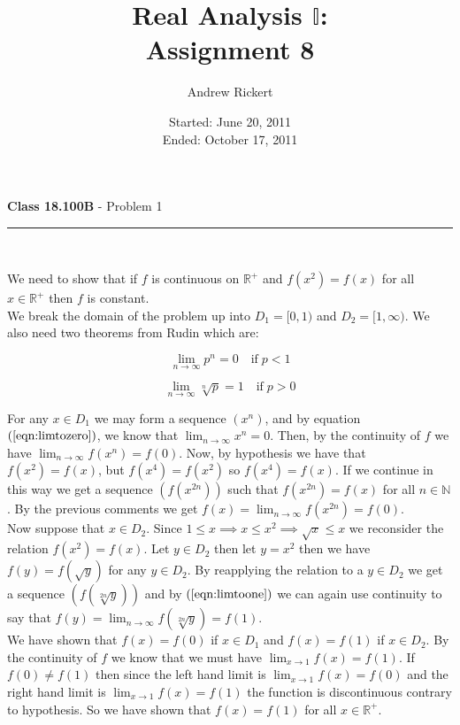 \documentclass[11pt,reqno]{article}
\title{Real Analysis $\mathbb{I}$: \\ Assignment 8}
\author{Andrew Rickert}
\date{Started: June 20, 2011 \\ \hspace{1pt} Ended: October 17,  2011}                                           %
\begin{document}
\maketitle


\begin{flushleft} 
\textbf{Class 18.100B} - Problem 1\\
\rule{500pt}{1pt}\\
\end{flushleft} 

We need to show that if $f$ is continuous on $\mathbb{R}^+$ and $f(x^2) = f(x)$ for all $x \in \mathbb{R}^+$ then $f$ is constant.\\
\indent We break the domain of the problem up into $D_1 = [0,1)$ and $D_2 = [1,\infty)$. We also need two theorems from Rudin which are:


\begin{equation}
\lim_{n \to \infty} p^n = 0 \quad \text{if} \; p < 1 \label{eqn:limtozero}
\end{equation}

\begin{equation}
\lim_{n \to \infty} \sqrt[n]{p} = 1 \quad \text{if} \; p > 0 \label{eqn:limtoone}
\end{equation}


For any $x \in D_1$ we may form a sequence $(x^n)$, and by equation $(\ref{eqn:limtozero})$, we know that $\lim_{n \to \infty} x^n = 0$. Then, by the continuity of $f$ we have $\lim_{n \to \infty} f(x^n) = f(0)$. Now, by hypothesis we have that \\
$f(x^2) = f(x)$, but $f(x^4) = f(x^2)$ so $f(x^4) = f(x)$. If we continue in this way we get a sequence $(f(x^{2n}))$ such that $f(x^{2n}) = f(x)$ for all $n \in \mathbb{N}$. By the previous comments we get $f(x) = \lim_{n \to \infty} f(x^{2n}) = f(0)$.\\
\indent Now suppose that $x \in D_2$. Since $1 \le x \implies x \le x^2 \implies \sqrt{x} \le x$ we reconsider the relation $f(x^2) = f(x)$. Let $y \in D_2$ then let $y = x^2$ then we have $f(y) = f(\sqrt{y})$ for any $y \in D_2$. By reapplying the relation to a $y \in D_2$ we get a sequence $(f(\sqrt[2n]{y}))$ and by $(\ref{eqn:limtoone})$ we can again use continuity to say that $f(y) = \lim_{n \to \infty}f(\sqrt[2n]{y}) = f(1)$. \\
\indent We have shown that $f(x)= f(0)$ if $x \in D_1$ and $f(x)= f(1)$ if $x \in D_2$. By the continuity of $f$ we know that we must have $\lim_{x \to 1}f(x) = f(1)$. If $f(0) \neq f(1)$ then since the left hand limit is $\lim_{x \to 1}f(x) = f(0)$ and the right hand limit is $\lim_{x \to 1}f(x) = f(1)$ the function is discontinuous contrary to hypothesis. So we have shown that $f(x) = f(1)$ for all $x \in \mathbb{R}^+$.
\end{document}
